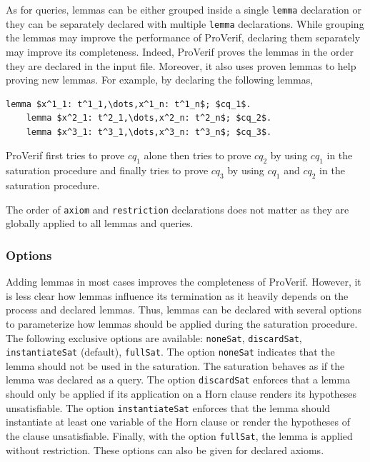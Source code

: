 \documentclass{book}
\begin{document}
As for queries, lemmas can be either grouped inside a single \lstinline!lemma! declaration or they can be separately declared with multiple \lstinline!lemma! declarations. While grouping the lemmas may improve the performance of ProVerif, declaring them separately may improve its completeness. Indeed, ProVerif proves the lemmas in the order they are declared in the input file. Moreover, it also uses proven lemmas to help proving new lemmas.
For example, by declaring the following lemmas,
\begin{lstlisting}[numbers=none]
	lemma $x^1_1: t^1_1,\dots,x^1_n: t^1_n$; $cq_1$.
	lemma $x^2_1: t^2_1,\dots,x^2_n: t^2_n$; $cq_2$.
	lemma $x^3_1: t^3_1,\dots,x^3_n: t^3_n$; $cq_3$.
\end{lstlisting}
ProVerif first tries to prove $cq_1$ alone then tries to prove $cq_2$ by using $cq_1$ in the saturation procedure and finally tries to prove $cq_3$ by using $cq_1$ and $cq_2$ in the saturation procedure.

The order of \lstinline!axiom! and \lstinline!restriction! declarations does not matter as they are globally applied to all lemmas and queries.

\subsubsection{Options}



Adding lemmas in most cases improves the completeness of ProVerif. However, it is less clear how lemmas influence its termination as it heavily depends on the process and declared lemmas. Thus, lemmas can be declared with several options to parameterize how lemmas should be applied during the saturation procedure. The following exclusive options are available: \lstinline!noneSat!, \lstinline!discardSat!, \lstinline!instantiateSat! (default), \lstinline!fullSat!. The option \lstinline!noneSat! indicates that the lemma should not be used in the saturation. The saturation behaves as if the lemma was declared as a query. The option \lstinline!discardSat! enforces that a lemma should only be applied if its application on a Horn clause renders its hypotheses unsatisfiable. The option \lstinline!instantiateSat! enforces that the lemma should instantiate at least one variable of the Horn clause or render the hypotheses of the clause unsatisfiable. Finally, with the option \lstinline!fullSat!, the lemma is applied without restriction. These options can also be given for declared axioms.
\end{document}

